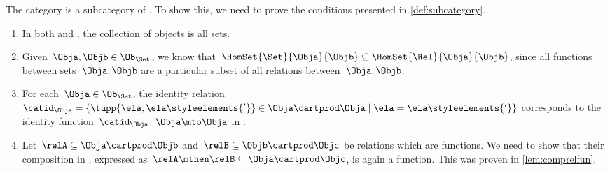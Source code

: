 \begin{example}
    The category \Set is a subcategory of \Rel.
    To show this, we need to prove the conditions presented in \cref{def:subcategory}.
    \begin{enumerate}
        \item In both \Rel and \Set, the collection of objects is all sets.
        \item Given~$\Obja,\Objb\in \Ob_{\Set}$, we know that~$\HomSet{\Set}{\Obja}{\Objb}\subseteq \HomSet{\Rel}{\Obja}{\Objb}$, since all functions between sets~$\Obja,\Objb$ are a particular subset of all relations between~$\Obja,\Objb$.
        \item For each~$\Obja \in \Ob_{\Set}$, the identity relation~$\catid_\Obja=\{\tupp{\ela,\ela\styleelements{'}}\in {\Obja} \cartprod \Obja \mid \ela=\ela\styleelements{'}\}$ corresponds to the identity function~$\catid_\Obja \colon \Obja \mto \Obja$ in \Set.
        \item Let~$\relA\subseteq \Obja\cartprod \Objb$ and~$\relB\subseteq \Objb \cartprod \Objc$ be relations which are functions.
              We need to show that their composition in \Rel, expressed as~$\relA\mthen \relB\subseteq \Obja\cartprod \Objc$, is again a function.
              This was proven in \cref{lem:comprelfun}.
    \end{enumerate}
\end{example}
